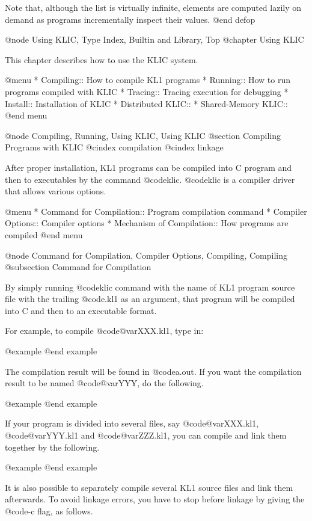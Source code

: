 {{{{Note that, although the list is virtually infinite, elements are
computed lazily on demand as programs incrementally inspect their
values.
@end defop

@node Using KLIC, Type Index, Builtin and Library, Top
@chapter Using KLIC

This chapter describes how to use the KLIC system.

@menu
* Compiling::                   How to compile KL1 programs
* Running::                     How to run programs compiled with KLIC
* Tracing::                     Tracing execution for debugging
* Install::                     Installation of KLIC
* Distributed KLIC::            
* Shared-Memory KLIC::          
@end menu

@node Compiling, Running, Using KLIC, Using KLIC
@section Compiling Programs with KLIC
@cindex compilation
@cindex linkage

After proper installation, KL1 programs can be compiled into C program
and then to executables by the command @code{klic}.  @code{klic} is a
compiler driver that allows various options.

@menu
* Command for Compilation::     Program compilation command
* Compiler Options::            Compiler options
* Mechanism of Compilation::    How programs are compiled
@end menu

@node Command for Compilation, Compiler Options, Compiling, Compiling
@subsection Command for Compilation

By simply running @code{klic} command with the name of KL1 program
source file with the trailing @code{.kl1} as an argument, that program
will be compiled into C and then to an executable format.

For example, to compile @code{@var{XXX}.kl1}, type in:

@example
@end example

The compilation result will be found in @code{a.out}.  If you want the
compilation result to be named @code{@var{YYY}}, do the following.

@example
@end example

If your program is divided into several files, say @code{@var{XXX}.kl1},
@code{@var{YYY}.kl1} and @code{@var{ZZZ}.kl1}, you can compile and link
them together by the following.

@example
@end example

It is also possible to separately compile several KL1 source files and
link them afterwards.  To avoid linkage errors, you have to stop before
linkage by giving the @code{-c} flag, as follows.

}}}}
